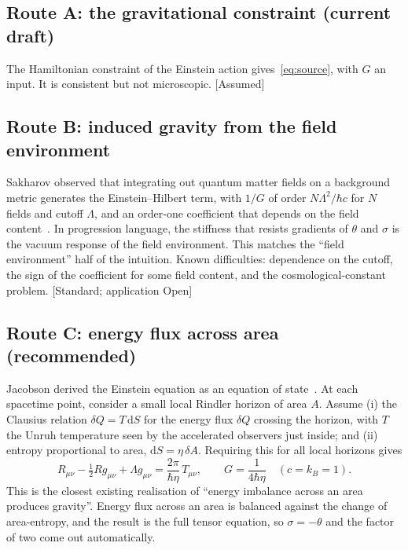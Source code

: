 \documentclass[11pt]{article}
\newcommand{\thP}{\theta}
\newcommand{\sgP}{\sigma}
\newcommand{\dd}{\mathrm{d}}
\newcommand{\st}[1]{\textsf{\small[#1]}}
\theoremstyle{plain}
\theoremstyle{remark}
\begin{document}
\subsection{Route A: the gravitational constraint (current draft)}
The Hamiltonian constraint of the Einstein action gives~\eqref{eq:source}, with $G$ an input. It is consistent but not microscopic. \st{Assumed}

\subsection{Route B: induced gravity from the field environment}
Sakharov observed that integrating out quantum matter fields on a background metric generates the Einstein--Hilbert term, with $1/G$ of order $N\Lambda^2/\hbar c$ for $N$ fields and cutoff $\Lambda$, and an order-one coefficient that depends on the field content~\cite{Sakharov1967,Visser2002}. In progression language, the stiffness that resists gradients of $\thP$ and $\sgP$ is the vacuum response of the field environment. This matches the ``field environment'' half of the intuition. Known difficulties: dependence on the cutoff, the sign of the coefficient for some field content, and the cosmological-constant problem. \st{Standard; application Open}

\subsection{Route C: energy flux across area (recommended)}
Jacobson derived the Einstein equation as an equation of state~\cite{Jacobson1995}. At each spacetime point, consider a small local Rindler horizon of area $A$. Assume (i) the Clausius relation $\delta Q=T\,\dd S$ for the energy flux $\delta Q$ crossing the horizon, with $T$ the Unruh temperature seen by the accelerated observers just inside; and (ii) entropy proportional to area, $\dd S=\eta\,\delta A$. Requiring this for all local horizons gives
\begin{equation}
R_{\mu\nu}-\tfrac12Rg_{\mu\nu}+\Lambda g_{\mu\nu}=\frac{2\pi}{\hbar\eta}\,T_{\mu\nu},
\qquad G=\frac{1}{4\hbar\eta}\quad(c=k_B=1).
\end{equation}
This is the closest existing realisation of ``energy imbalance across an area produces gravity''. Energy flux across an area is balanced against the change of area-entropy, and the result is the full tensor equation, so $\sgP=-\thP$ and the factor of two come out automatically.
\end{document}
